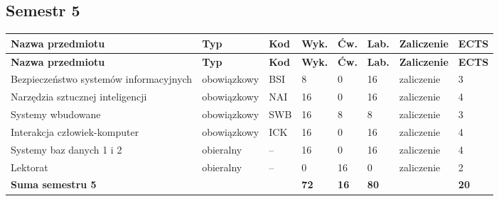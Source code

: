 \documentclass[12pt,a4paper]{article}
\newcommand{\thdrule}{\noalign{\global\setlength{\extrarowheight}{0pt}}}
\newcommand{\thdend}{\noalign{\global\setlength{\extrarowheight}{4pt}}}
\begin{document}
\clearpage
\subsection*{Semestr 5}

{\scriptsize
\begin{longtable}{m{5.0cm}m{1.9cm}m{0.75cm}m{0.85cm}m{0.85cm}m{0.85cm}m{1.45cm}m{0.9cm}}
\thdrule\toprule
\rowcolor{pjatkRed}
{\color{white}\footnotesize\textbf{\vphantom{Ag}Nazwa przedmiotu}} & {\color{white}\footnotesize\textbf{\vphantom{Ag}Typ}} & {\color{white}\footnotesize\textbf{\vphantom{Ag}Kod}} & {\color{white}\footnotesize\textbf{\vphantom{Ag}Wyk.}} & {\color{white}\footnotesize\textbf{\vphantom{Ag}Ćw.}} & {\color{white}\footnotesize\textbf{\vphantom{Ag}Lab.}} & {\color{white}\footnotesize\textbf{\vphantom{Ag}Zaliczenie}} & {\color{white}\footnotesize\textbf{\vphantom{Ag}ECTS}} \\
\midrule\thdend
\endfirsthead
\thdrule\toprule
\rowcolor{pjatkRed}
{\color{white}\footnotesize\textbf{\vphantom{Ag}Nazwa przedmiotu}} & {\color{white}\footnotesize\textbf{\vphantom{Ag}Typ}} & {\color{white}\footnotesize\textbf{\vphantom{Ag}Kod}} & {\color{white}\footnotesize\textbf{\vphantom{Ag}Wyk.}} & {\color{white}\footnotesize\textbf{\vphantom{Ag}Ćw.}} & {\color{white}\footnotesize\textbf{\vphantom{Ag}Lab.}} & {\color{white}\footnotesize\textbf{\vphantom{Ag}Zaliczenie}} & {\color{white}\footnotesize\textbf{\vphantom{Ag}ECTS}} \\
\midrule\thdend
\endhead
\rowcolor{tableRowLight} Bezpieczeństwo systemów informacyjnych & {\scriptsize obowiązkowy} & BSI & 8 & 0 & 16 & {\scriptsize zaliczenie} & 3 \\
\rowcolor{tableRowAlt} Narzędzia sztucznej inteligencji & {\scriptsize obowiązkowy} & NAI & 16 & 0 & 16 & {\scriptsize zaliczenie} & 4 \\
\rowcolor{tableRowLight} Systemy wbudowane & {\scriptsize obowiązkowy} & SWB & 16 & 8 & 8 & {\scriptsize zaliczenie} & 3 \\
\rowcolor{tableRowAlt} Interakcja człowiek-komputer & {\scriptsize obowiązkowy} & ICK & 16 & 0 & 16 & {\scriptsize zaliczenie} & 4 \\
\rowcolor{tableElective} Systemy baz danych 1 i 2 & {\scriptsize obieralny} & -- & 16 & 0 & 16 & {\scriptsize zaliczenie} & 4 \\
\rowcolor{tableElective} Lektorat & {\scriptsize obieralny} & -- & 0 & 16 & 0 & {\scriptsize zaliczenie} & 2 \\
\midrule[\heavyrulewidth]
\rowcolor{tableSummary} \textbf{Suma semestru 5} & & & \textbf{72} & \textbf{16} & \textbf{80} & & \textbf{20} \\
\bottomrule
\end{longtable}}
\end{document}
